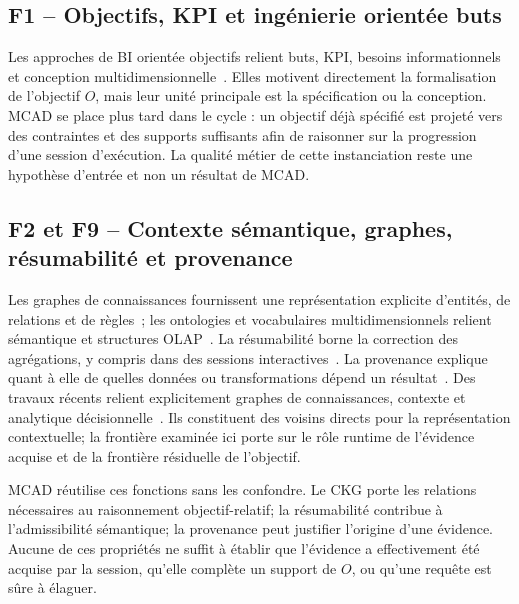 \documentclass[journal]{IEEEtran}
\begin{document}
\subsection{F1 -- Objectifs, KPI et ingénierie orientée buts}

Les approches de BI orientée objectifs relient buts, KPI, besoins informationnels et conception multidimensionnelle~\cite{Pourshahid2014,NasiriAhmedWrembelZimanyi2017,MateTrujilloMylopoulos2017,RoldanGarciaEtAl2021,DiamantiniKPISurvey2025}. Elles motivent directement la formalisation de l'objectif $O$, mais leur unité principale est la spécification ou la conception. MCAD se place plus tard dans le cycle : un objectif déjà spécifié est projeté vers des contraintes et des supports suffisants afin de raisonner sur la progression d'une session d'exécution. La qualité métier de cette instanciation reste une hypothèse d'entrée et non un résultat de MCAD.

\subsection{F2 et F9 -- Contexte sémantique, graphes, résumabilité et provenance}

Les graphes de connaissances fournissent une représentation explicite d'entités, de relations et de règles~\cite{HoganKGSurvey2021}; les ontologies et vocabulaires multidimensionnels relient sémantique et structures OLAP~\cite{Etcheverry2014,W3CDataCube2014,SchuetzSerafiniBozzato2021}. La résumabilité borne la correction des agrégations, y compris dans des sessions interactives~\cite{HornerSongChen2004,SimonAmannLiuGancarski2023}. La provenance explique quant à elle de quelles données ou transformations dépend un résultat~\cite{AlOmeirLaiMilaniPottinger2023,W3CPROVO2013}. Des travaux récents relient explicitement graphes de connaissances, contexte et analytique décisionnelle~\cite{StaudingerSchuetzSchrefl2025,HuangZaslavsky2024}. Ils constituent des voisins directs pour la représentation contextuelle; la frontière examinée ici porte sur le rôle runtime de l'évidence acquise et de la frontière résiduelle de l'objectif.

MCAD réutilise ces fonctions sans les confondre. Le CKG porte les relations nécessaires au raisonnement objectif-relatif; la résumabilité contribue à l'admissibilité sémantique; la provenance peut justifier l'origine d'une évidence. Aucune de ces propriétés ne suffit à établir que l'évidence a effectivement été acquise par la session, qu'elle complète un support de $O$, ou qu'une requête est sûre à élaguer.
\end{document}

